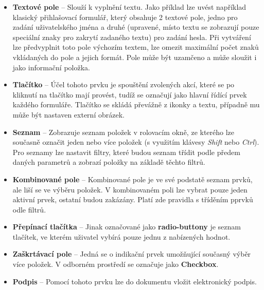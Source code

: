 	\begin{itemize}
	\item \textbf{Textové pole} -- Slouží k vyplnění textu. Jako příklad lze uvést například klasický přihlašovací formulář, který obsahuje 2 textové pole, jedno pro zadání uživatelského jména a druhé (upravené, místo textu se zobrazují pouze speciální znaky pro zakrytí zadaného textu)  pro zadání hesla. Při vytváření lze předvyplnit toto pole výchozím textem, lze omezit maximální počet znaků vkládaných do pole a jejich formát. Pole může být uzamčeno a může sloužit i jako informační položka.
	\item \textbf{Tlačítko} -- Účel tohoto prvku je spouštění zvolených akcí, které se po kliknutí na tlačítko mají provést, tudíž se označují jako hlavní řídící prvek každého formuláře. Tlačítko se skládá převážně z ikonky a textu, případně mu může být nastaven externí obrázek.
	\item \textbf{Seznam} -- Zobrazuje seznam položek v rolovacím okně, ze kterého lze současně označit jeden nebo více položek (s využitím klávesy \textit{Shift} nebo \textit{Ctrl}). Pro seznamy lze nastavit filtry, které budou seznam třídit podle předem daných parametrů a zobrazí položky na základě těchto filtrů.
	\item \textbf{Kombinované pole} -- Kombinované pole je ve své podstatě seznam prvků, ale liší se ve výběru položek. V kombinovaném poli lze vybrat pouze jeden aktivní prvek, ostatní budou zakázány. Platí zde pravidla s tříděním pprvků odle filtrů.
	\item \textbf{Přepínací tlačítka} -- Jinak označované jako \textbf{radio-buttony} je seznam tlačítek, ve kterém uživatel vybírá pouze jednu z nabízených hodnot.
	\item \textbf{Zaškrtávací pole} -- Jedná se o indikační prvek umožňující současný výběr více položek. V odborném prostředí se označuje jako \textbf{Checkbox}.
	\item \textbf{Podpis} -- Pomocí tohoto prvku lze do dokumentu vložit elektronický podpis.
	\end{itemize}